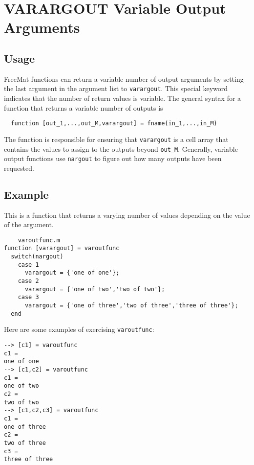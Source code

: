 \section{VARARGOUT Variable Output Arguments}

\subsection{Usage}

FreeMat functions can return a variable number of output arguments
by setting the last argument in the argument list to \verb|varargout|.
This special keyword indicates that the number of return values
is variable.  The general syntax for a function that returns
a variable number of outputs is
\begin{verbatim}
  function [out_1,...,out_M,varargout] = fname(in_1,...,in_M)
\end{verbatim}
The function is responsible for ensuring that \verb|varargout| is
a cell array that contains the values to assign to the outputs
beyond \verb|out_M|.  Generally, variable output functions use
\verb|nargout| to figure out how many outputs have been requested.
\subsection{Example}

This is a function that returns a varying number of values
depending on the value of the argument.
\begin{verbatim}
    varoutfunc.m
function [varargout] = varoutfunc
  switch(nargout)
    case 1
      varargout = {'one of one'};
    case 2
      varargout = {'one of two','two of two'};
    case 3
      varargout = {'one of three','two of three','three of three'};
  end
\end{verbatim}
Here are some examples of exercising \verb|varoutfunc|:
\begin{verbatim}
--> [c1] = varoutfunc
c1 = 
one of one
--> [c1,c2] = varoutfunc
c1 = 
one of two
c2 = 
two of two
--> [c1,c2,c3] = varoutfunc
c1 = 
one of three
c2 = 
two of three
c3 = 
three of three
\end{verbatim}
